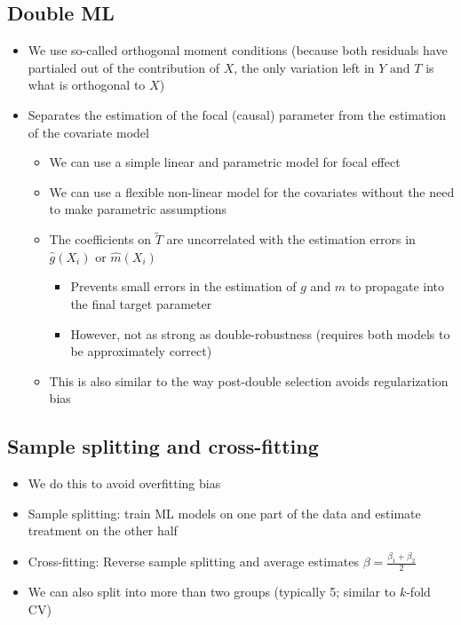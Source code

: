 \documentclass[10pt]{article}
\begin{document}
\subsection{Double ML}
\begin{itemize}
    \item We use so-called orthogonal moment conditions (because both residuals have partialed out of the contribution of $X $, the only variation left in $Y \text{ and } T $ is what is orthogonal to $X $)
    \item Separates the estimation of the focal (causal) parameter from the estimation of the covariate model 
    \begin{itemize}
        \item We can use a simple linear and parametric model for focal effect 
        \item We can use a flexible non-linear model for the covariates without the need to make parametric assumptions 
        \item The coefficients on $\tilde{T} $ are uncorrelated with the estimation errors in $\hat{g}(X_i) \text{ or } \hat{m}(X_i) $
        \begin{itemize}
            \item Prevents small errors in the estimation of $g $ and $ m $ to propagate into the final target parameter 
            \item However, not as strong as double-robustness (requires both models to be approximately correct)
        \end{itemize}
        \item This is also similar to the way post-double selection avoids regularization bias 
    \end{itemize}
\end{itemize}
\subsection{Sample splitting and cross-fitting}
\begin{itemize}
    \item We do this to avoid overfitting bias 
    \item Sample splitting: train ML models on one part of the data and estimate treatment on the other half 
    \item Cross-fitting: Reverse sample splitting and average estimates $\beta = \frac{\beta_1 + \beta_2}{2} $
    \item We can also split into more than two groups (typically 5; similar to $k $-fold CV)
\end{itemize}
\newpage 
\end{document}
